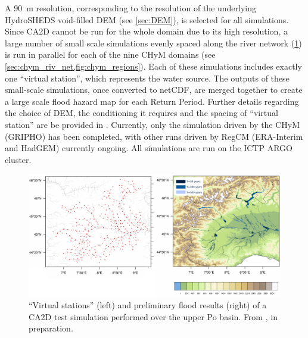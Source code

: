 A \SI{90}{\metre} resolution, corresponding to the resolution of the underlying HydroSHEDS void-filled DEM (see \cref{sec:DEM}), is selected for all simulations.
Since CA2D cannot be run for the whole domain due to its high resolution, a large number of small scale simulations evenly spaced along the river network (\cref{fig:ca2d_fakestations}) is run in parallel for each of the nine CHyM domains (see \cref{sec:chym_riv_net,fig:chym_regions}).
Each of these simulations includes exactly one ``virtual station'', which represents the water source.
The outputs of these small-scale simulations, once converted to netCDF, are merged together to create a large scale flood hazard map for each Return Period.
Further details regarding the choice of DEM, the conditioning it requires and the spacing of ``virtual station'' are be provided in \citet[][in preparation]{Nogherotto2018}.
Currently, only the simulation driven by the CHyM (GRIPHO) has been completed, with other runs driven by RegCM (ERA-Interim and HadGEM) currently ongoing.
All simulations are run on the ICTP ARGO cluster.
\begin{figure}
    \centering
    \includegraphics[width=\textwidth]{figures/valid_flood/overlay_chym_locations.png}
    \decoRule
    \caption[``Virtual stations'' and preliminary results of a CA2D simulations over the upper Po basin]{``Virtual stations'' (left) and preliminary flood results (right) of a CA2D test simulation performed over the upper Po basin. From \citet{Nogherotto2018}, in preparation.}
    \label{fig:ca2d_fakestations}
\end{figure}

